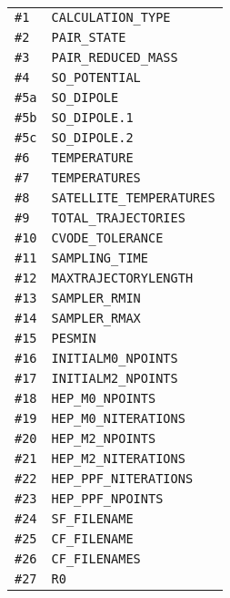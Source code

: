 \documentclass[color]{article}
\begin{document}
\begin{table}[H]
  \begin{tabular}{ll}
    \texttt{\#1} & \texttt{CALCULATION\_TYPE} \\
    \texttt{\#2} & \texttt{PAIR\_STATE} \\
    \texttt{\#3} & \texttt{PAIR\_REDUCED\_MASS} \\
    \texttt{\#4} & \texttt{SO\_POTENTIAL} \\
    \texttt{\#5a} & \texttt{SO\_DIPOLE} \\
    \texttt{\#5b} & \texttt{SO\_DIPOLE.1} \\
    \texttt{\#5c} & \texttt{SO\_DIPOLE.2} \\
    \texttt{\#6} & \texttt{TEMPERATURE} \\
    \texttt{\#7} & \texttt{TEMPERATURES} \\
    \texttt{\#8} & \texttt{SATELLITE\_TEMPERATURES} \\
    \texttt{\#9} & \texttt{TOTAL\_TRAJECTORIES} \\
    \texttt{\#10} & \texttt{CVODE\_TOLERANCE} \\
    \texttt{\#11} & \texttt{SAMPLING\_TIME} \\
    \texttt{\#12} & \texttt{MAXTRAJECTORYLENGTH} \\
    \texttt{\#13} & \texttt{SAMPLER\_RMIN} \\
    \texttt{\#14} & \texttt{SAMPLER\_RMAX} \\
    \texttt{\#15} & \texttt{PESMIN} \\
    \texttt{\#16} & \texttt{INITIALM0\_NPOINTS} \\
    \texttt{\#17} & \texttt{INITIALM2\_NPOINTS} \\
    \texttt{\#18} & \texttt{HEP\_M0\_NPOINTS} \\
    \texttt{\#19} & \texttt{HEP\_M0\_NITERATIONS} \\
    \texttt{\#20} & \texttt{HEP\_M2\_NPOINTS} \\
    \texttt{\#21} & \texttt{HEP\_M2\_NITERATIONS} \\
    \texttt{\#22} & \texttt{HEP\_PPF\_NITERATIONS} \\
    \texttt{\#23} & \texttt{HEP\_PPF\_NPOINTS} \\
    \texttt{\#24} & \texttt{SF\_FILENAME} \\
    \texttt{\#25} & \texttt{CF\_FILENAME} \\
    \texttt{\#26} & \texttt{CF\_FILENAMES} \\
    \texttt{\#27} & \texttt{R0} \\

\end{tabular}
\end{table}
\end{document}
